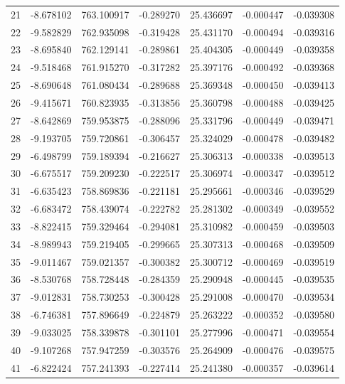 \begin{tabular}{rrrrrrr}
  21 &  -8.678102 &  763.100917 & -0.289270 &  25.436697 &  -0.000447 & -0.039308 \\
  22 &  -9.582829 &  762.935098 & -0.319428 &  25.431170 &  -0.000494 & -0.039316 \\
  23 &  -8.695840 &  762.129141 & -0.289861 &  25.404305 &  -0.000449 & -0.039358 \\
  24 &  -9.518468 &  761.915270 & -0.317282 &  25.397176 &  -0.000492 & -0.039368 \\
  25 &  -8.690648 &  761.080434 & -0.289688 &  25.369348 &  -0.000450 & -0.039413 \\
  26 &  -9.415671 &  760.823935 & -0.313856 &  25.360798 &  -0.000488 & -0.039425 \\
  27 &  -8.642869 &  759.953875 & -0.288096 &  25.331796 &  -0.000449 & -0.039471 \\
  28 &  -9.193705 &  759.720861 & -0.306457 &  25.324029 &  -0.000478 & -0.039482 \\
  29 &  -6.498799 &  759.189394 & -0.216627 &  25.306313 &  -0.000338 & -0.039513 \\
  30 &  -6.675517 &  759.209230 & -0.222517 &  25.306974 &  -0.000347 & -0.039512 \\
  31 &  -6.635423 &  758.869836 & -0.221181 &  25.295661 &  -0.000346 & -0.039529 \\
  32 &  -6.683472 &  758.439074 & -0.222782 &  25.281302 &  -0.000349 & -0.039552 \\
  33 &  -8.822415 &  759.329464 & -0.294081 &  25.310982 &  -0.000459 & -0.039503 \\
  34 &  -8.989943 &  759.219405 & -0.299665 &  25.307313 &  -0.000468 & -0.039509 \\
  35 &  -9.011467 &  759.021357 & -0.300382 &  25.300712 &  -0.000469 & -0.039519 \\
  36 &  -8.530768 &  758.728448 & -0.284359 &  25.290948 &  -0.000445 & -0.039535 \\
  37 &  -9.012831 &  758.730253 & -0.300428 &  25.291008 &  -0.000470 & -0.039534 \\
  38 &  -6.746381 &  757.896649 & -0.224879 &  25.263222 &  -0.000352 & -0.039580 \\
  39 &  -9.033025 &  758.339878 & -0.301101 &  25.277996 &  -0.000471 & -0.039554 \\
  40 &  -9.107268 &  757.947259 & -0.303576 &  25.264909 &  -0.000476 & -0.039575 \\
  41 &  -6.822424 &  757.241393 & -0.227414 &  25.241380 &  -0.000357 & -0.039614 \\

\end{tabular}
